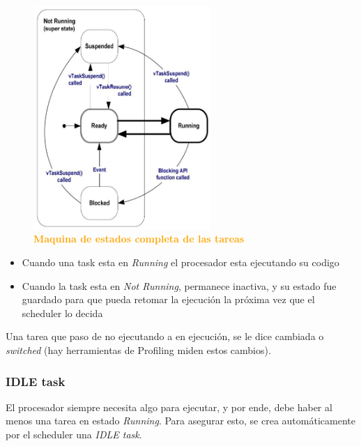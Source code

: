 \documentclass{article}
\begin{document}
\\

\begin{figure}[H]
   \centering
   \includegraphics[width=0.6\textwidth]{figures/state.jpg}
   \centering
   \caption{\textbf{\textcolor{Orange}{Maquina de estados completa de las tareas}}}
\end{figure}




\begin{itemize}
\item Cuando una task esta en \textit{Running} el procesador esta ejecutando su codigo
\item Cuando la task esta en \textit{Not Running}, permanece inactiva, y su estado fue guardado para que pueda retomar la ejecución la próxima vez que el scheduler lo decida
\end{itemize}

Una tarea que paso de no ejecutando a en ejecución, se le dice cambiada o \textit{switched} (hay herramientas de Profiling miden estos cambios).\\

\clearpage

\subsubsection{IDLE task}
El procesador siempre necesita algo para ejecutar, y por ende, debe haber al menos una tarea en estado \textit{Running}. Para asegurar esto, se crea automáticamente por el scheduler una \textit{IDLE task}. \\
\end{document}
